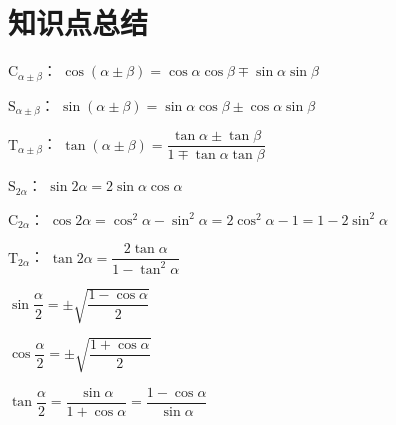 \section{知识点总结}
  \begin{description}[leftmargin=0pt,labelsep=0pt]
    \item%
      \begin{itemizeMy}
        \item $\mathrm{C}_{\alpha\pm\beta}$：
        $\cos(\alpha\pm\beta)=\cos\alpha\cos\beta \mp \sin\alpha\sin\beta$
        \item $\mathrm{S}_{\alpha\pm\beta}$：
        $\sin(\alpha\pm\beta)=\sin\alpha\cos\beta \pm \cos\alpha\sin\beta$
        \item $\mathrm{T}_{\alpha\pm\beta}$：
        $\tan(\alpha\pm\beta)=\dfrac{\tan\alpha\pm \tan\beta}{1\mp\tan\alpha\tan\beta}$
      \end{itemizeMy}
    \item%
      \begin{itemizeMy}
        \item $\mathrm{S}_{2\alpha}$：
        $\sin{2\alpha}=2\sin\alpha\cos\alpha$
        \item $\mathrm{C}_{2\alpha}$：
        $\cos{2\alpha}=\cos^2{\alpha}-\sin^2{\alpha}=2\cos^2\alpha-1=1-2\sin^2\alpha$
        \item $\mathrm{T}_{2\alpha}$：
        $\tan{2\alpha}=\dfrac{2\tan\alpha}{1-\tan^2\alpha}$
      \end{itemizeMy}
      \item%
        \begin{itemizeMy}
          \item
          $\sin{\dfrac{\alpha}2}=\pm\sqrt{\dfrac{1-\cos\alpha}2}$
          \item $\cos{\dfrac{\alpha}2}=\pm\sqrt{\dfrac{1+\cos\alpha}2}$
          \item $\tan{\dfrac{\alpha}2}=\dfrac{\sin\alpha}{1+\cos\alpha}=\dfrac{1-\cos\alpha}{\sin\alpha}$
        \end{itemizeMy}
      \item%
        \begin{itemizeMy}[万能公式\hspace{4em}]
          \item $\sin{\alpha}=\dfrac{2\tan{\dfrac{\alpha}2}}{1+\tan^2{\dfrac{\alpha}2}}}$

\end{itemizeMy}
\end{description}
